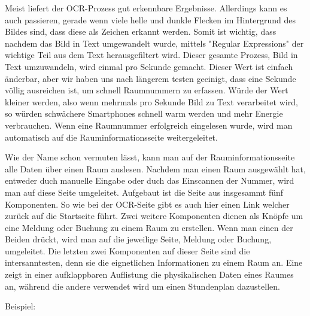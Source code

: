 
Meist liefert der OCR-Prozess gut erkennbare Ergebnisse. Allerdings kann es auch passieren, gerade wenn viele helle und dunkle Flecken im Hintergrund des Bildes sind, dass diese als Zeichen erkannt werden. Somit ist wichtig, dass nachdem das Bild in Text umgewandelt wurde, mittels "Regular Expressions" der wichtige Teil aus dem Text herausgefiltert wird. Dieser gesamte Prozess, Bild in Text umzuwandeln, wird einmal pro Sekunde gemacht. Dieser Wert ist einfach änderbar, aber wir haben uns nach längerem testen geeinigt, dass eine Sekunde völlig ausreichen ist, um schnell Raumnummern zu erfassen. Würde der Wert kleiner werden, also wenn mehrmals pro Sekunde Bild zu Text verarbeitet wird, so würden schwächere Smartphones schnell warm werden und mehr Energie verbrauchen. Wenn eine Raumnummer erfolgreich eingelesen wurde, wird man automatisch auf die Rauminformationsseite weitergeleitet.


Wie der Name schon vermuten lässt, kann man auf der Rauminformationsseite alle Daten über einen Raum auslesen. Nachdem man einen Raum ausgewählt hat, entweder duch manuelle Eingabe oder duch das Einscannen der Nummer, wird man auf diese Seite umgeleitet. Aufgebaut ist die Seite aus insgesammt fünf Komponenten. So wie bei der OCR-Seite gibt es auch hier einen Link welcher zurück auf die Startseite führt. Zwei weitere Komponenten dienen als Knöpfe um eine Meldung oder Buchung zu einem Raum zu erstellen. Wenn man einen der Beiden drückt, wird man auf die jeweilige Seite, Meldung oder Buchung, umgeleitet. Die letzten zwei Komponenten auf dieser Seite sind die intersanntesten, denn sie die eignetlichen Informationen zu einem Raum an. Eine zeigt in einer aufklappbaren Auflistung die physikalischen Daten eines Raumes an, während die andere verwendet wird um einen Stundenplan dazustellen.

Beispiel:

